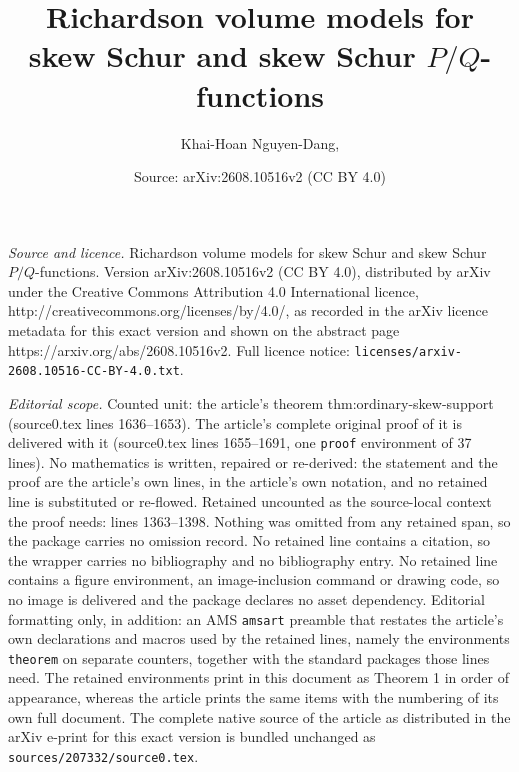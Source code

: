 \documentclass[10pt,a4paper]{amsart}
\title{Richardson volume models for skew Schur and skew Schur $P/Q$-functions}
\author{Khai-Hoan Nguyen-Dang,}
\date{Source: arXiv:2608.10516v2 (CC BY 4.0)}
\begin{document}
\maketitle

\noindent\emph{Source and licence.} Richardson volume models for skew Schur and skew Schur $P/Q$-functions. Version arXiv:2608.10516v2 (CC BY 4.0), distributed by arXiv under the Creative Commons Attribution 4.0 International licence, http://creativecommons.org/licenses/by/4.0/, as recorded in the arXiv licence metadata for this exact version and shown on the abstract page https://arxiv.org/abs/2608.10516v2. Full licence notice: \texttt{licenses/arxiv-2608.10516-CC-BY-4.0.txt}.\par\smallskip

\noindent\textit{Editorial scope.} Counted unit: the article's theorem thm:ordinary-skew-support (source0.tex lines 1636--1653). The article's complete original proof of it is delivered with it (source0.tex lines 1655--1691, one \texttt{proof} environment of 37 lines). No mathematics is written, repaired or re-derived: the statement and the proof are the article's own lines, in the article's own notation, and no retained line is substituted or re-flowed.  Retained uncounted as the source-local context the proof needs: lines 1363--1398.  Nothing was omitted from any retained span, so the package carries no omission record.  No retained line contains a citation, so the wrapper carries no bibliography and no bibliography entry.  No retained line contains a figure environment, an image-inclusion command or drawing code, so no image is delivered and the package declares no asset dependency.  Editorial formatting only, in addition: an AMS \texttt{amsart} preamble that restates the article's own declarations and macros used by the retained lines, namely the environments \texttt{theorem} on separate counters, together with the standard packages those lines need.  The retained environments print in this document as Theorem 1 in order of appearance, whereas the article prints the same items with the numbering of its own full document.  The complete native source of the article as distributed in the arXiv e-print for this exact version is bundled unchanged as \texttt{sources/207332/source0.tex}.
\end{document}
